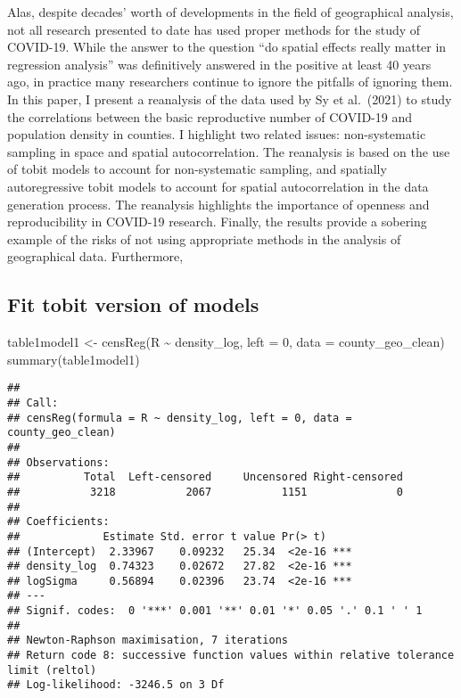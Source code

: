 \documentclass[10pt,letterpaper]{article}
\newenvironment{Shaded}{\begin{snugshade}}{\end{snugshade}}
\newcommand{\AttributeTok}[1]{\textcolor[rgb]{0.77,0.63,0.00}{#1}}
\newcommand{\DecValTok}[1]{\textcolor[rgb]{0.00,0.00,0.81}{#1}}
\newcommand{\FunctionTok}[1]{\textcolor[rgb]{0.00,0.00,0.00}{#1}}
\newcommand{\NormalTok}[1]{#1}
\newcommand{\OtherTok}[1]{\textcolor[rgb]{0.56,0.35,0.01}{#1}}
\newcommand{\SpecialCharTok}[1]{\textcolor[rgb]{0.00,0.00,0.00}{#1}}
\begin{document}
Alas, despite decades' worth of developments in the field of
geographical analysis, not all research presented to date has used
proper methods for the study of COVID-19. While the answer to the
question ``do spatial effects really matter in regression analysis'' was
definitively answered in the positive at least 40 years ago, in practice
many researchers continue to ignore the pitfalls of ignoring them. In
this paper, I present a reanalysis of the data used by Sy et al.~(2021)
to study the correlations between the basic reproductive number of
COVID-19 and population density in counties. I highlight two related
issues: non-systematic sampling in space and spatial autocorrelation.
The reanalysis is based on the use of tobit models to account for
non-systematic sampling, and spatially autoregressive tobit models to
account for spatial autocorrelation in the data generation process. The
reanalysis highlights the importance of openness and reproducibility in
COVID-19 research. Finally, the results provide a sobering example of
the risks of not using appropriate methods in the analysis of
geographical data. Furthermore,

\hypertarget{fit-tobit-version-of-models}{%
\subsection{Fit tobit version of
models}\label{fit-tobit-version-of-models}}

\begin{Shaded}
\begin{Highlighting}[]
\NormalTok{table1model1 }\OtherTok{\textless{}{-}} \FunctionTok{censReg}\NormalTok{(R }\SpecialCharTok{\textasciitilde{}}\NormalTok{ density\_log, }
                        \AttributeTok{left =} \DecValTok{0}\NormalTok{,}
                    \AttributeTok{data =}\NormalTok{ county\_geo\_clean)}
\FunctionTok{summary}\NormalTok{(table1model1)}
\end{Highlighting}
\end{Shaded}

\begin{verbatim}
## 
## Call:
## censReg(formula = R ~ density_log, left = 0, data = county_geo_clean)
## 
## Observations:
##          Total  Left-censored     Uncensored Right-censored 
##           3218           2067           1151              0 
## 
## Coefficients:
##             Estimate Std. error t value Pr(> t)    
## (Intercept)  2.33967    0.09232   25.34  <2e-16 ***
## density_log  0.74323    0.02672   27.82  <2e-16 ***
## logSigma     0.56894    0.02396   23.74  <2e-16 ***
## ---
## Signif. codes:  0 '***' 0.001 '**' 0.01 '*' 0.05 '.' 0.1 ' ' 1
## 
## Newton-Raphson maximisation, 7 iterations
## Return code 8: successive function values within relative tolerance limit (reltol)
## Log-likelihood: -3246.5 on 3 Df
\end{verbatim}
\end{document}
